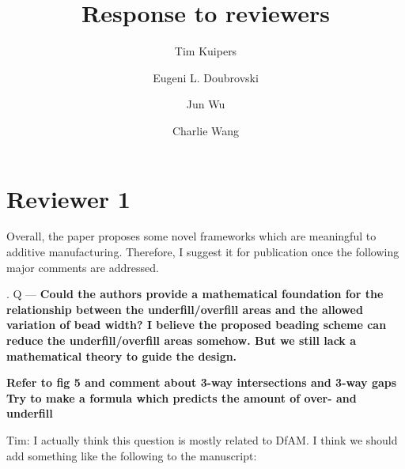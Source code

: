 \documentclass[5p,twocolumn,10pt,times]{elsarticle}
\theoremstyle{definition}
\newcommand{\todo}[1]{{\bf \color{orange}#1}}
\newcommand\Que[1]{%
   \leavevmode\par
   \stepcounter{question}
   \noindent
   \thequestion. Q --- {\bf#1}\par}
\newcounter{question}
\numberwithin{question}{section}
\begin{document}
\baselineskip11pt 

\begin{frontmatter} 

\title{
Response to reviewers}


\author[um,tud]{Tim Kuipers}
\author[tud]{Eugeni L. Doubrovski}
\author[tud]{Jun Wu}
\author[cuhk]{Charlie Wang}
\address[um]{Ultimaker, Utrecht, The Netherlands}
\address[tud]{Department of Design Engineering, Delft University of Technology, The Netherlands}
\address[cuhk]{Department of Mechanical and Automation Engineering, The Chinese University of Hong Kong, Hong Kong SAR, China}



%
%


\end{frontmatter}

\section{Reviewer 1}
Overall, the paper proposes some novel frameworks which are meaningful to additive manufacturing. Therefore, I suggest it for publication once the following major comments are addressed. 

\Que{
Could the authors provide a mathematical foundation for the relationship between the underfill/overfill areas and the allowed variation of bead width? I believe the proposed beading scheme can reduce the underfill/overfill areas somehow. But we still lack a mathematical theory to guide the design.
}

\todo{
Refer to fig 5 and comment about 3-way intersections and 3-way gaps
Try to make a formula which predicts the amount of over- and underfill

Tim: I actually think this question is mostly related to DfAM. I think we should add something like the following to the manuscript:
}
\end{document}

